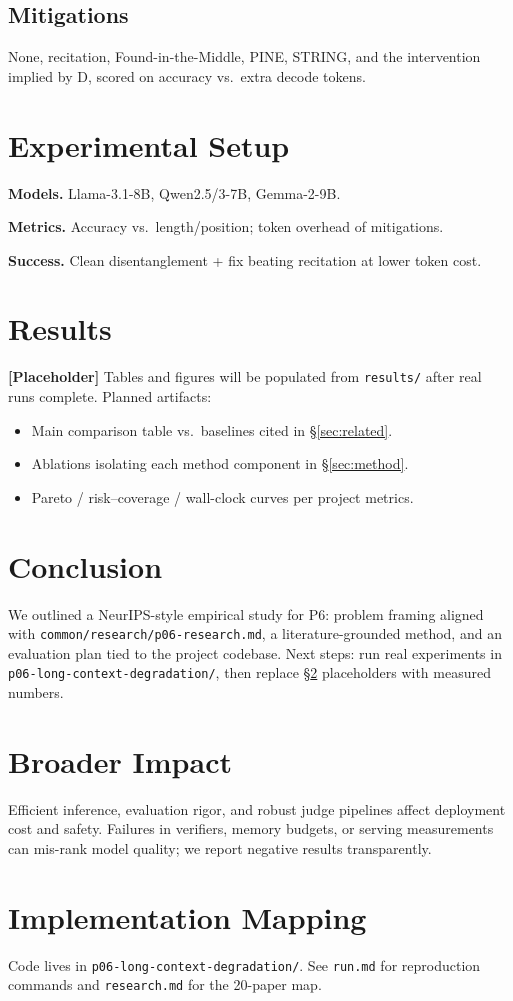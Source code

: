 \documentclass[11pt]{article}
\begin{document}
\subsection{Mitigations}
None, recitation, Found-in-the-Middle, PINE, STRING, and the intervention implied by D, scored on accuracy vs.\ extra decode tokens.

\section{Experimental Setup}
\label{sec:experiments}
\textbf{Models.} Llama-3.1-8B, Qwen2.5/3-7B, Gemma-2-9B.

\textbf{Metrics.} Accuracy vs.\ length/position; token overhead of mitigations.

\textbf{Success.} Clean disentanglement + fix beating recitation at lower token cost.

\section{Results}
\label{sec:results}
\textbf{[Placeholder]} Tables and figures will be populated from \texttt{results/} after real runs complete. Planned artifacts:
\begin{itemize}
    \item Main comparison table vs.\ baselines cited in \S\ref{sec:related}.
    \item Ablations isolating each method component in \S\ref{sec:method}.
    \item Pareto / risk--coverage / wall-clock curves per project metrics.
\end{itemize}

\section{Conclusion}
\label{sec:conclusion}
We outlined a NeurIPS-style empirical study for P6: problem framing aligned with \texttt{common/research/p06-research.md}, a literature-grounded method, and an evaluation plan tied to the project codebase. Next steps: run real experiments in \texttt{p06-long-context-degradation/}, then replace \S\ref{sec:results} placeholders with measured numbers.

\section*{Broader Impact}
Efficient inference, evaluation rigor, and robust judge pipelines affect deployment cost and safety. Failures in verifiers, memory budgets, or serving measurements can mis-rank model quality; we report negative results transparently.




\appendix
\section{Implementation Mapping}
\label{app:code}
Code lives in \texttt{p06-long-context-degradation/}. See \texttt{run.md} for reproduction commands and \texttt{research.md} for the 20-paper map.
\end{document}
